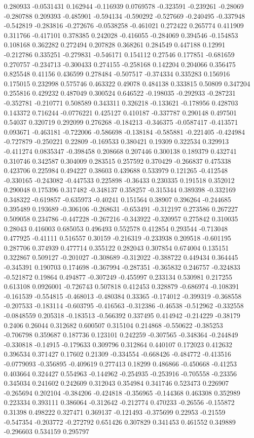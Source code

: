 0.280933 -0.0531431 0.162944 -0.116939 0.0769578 -0.323591 -0.239261 -0.28069 -0.280788 0.209393 -0.485901 -0.594134 -0.590292 -0.527669 -0.240495 -0.337948 -0.542819 -0.283816 -0.272676 -0.0538258 -0.461021 0.272422 0.265774 0.411909 0.311766 -0.417101 0.378385 0.242028 -0.416055 -0.284069 0.394546 -0.154853 0.108168 0.362282 0.272494 0.207828 0.368261 0.284549 0.447188 0.12991 -0.212786 0.335251 -0.279831 -0.546171 0.154112 0.27546 0.177851 -0.681659 0.270757 -0.234713 -0.300433 0.274155 -0.258168 0.142204 0.204066 0.356475 0.825548 0.41156 0.436599 0.278484 -0.507517 -0.374334 0.335283 0.156916 0.175015 0.232998 0.575746 0.463322 0.49078 0.484138 0.333815 0.50809 0.347204 0.255816 0.429232 0.487049 0.300524 0.646522 -0.198035 -0.292933 -0.287231 -0.352781 -0.210771 0.508589 0.343311 0.326218 -0.133621 -0.178956 0.428703 0.143372 0.716244 -0.0776221 0.425127 0.410187 -0.337787 0.290148 0.497501 0.54037 0.320719 0.292099 0.276268 -0.184213 -0.346375 -0.0587417 -0.413571 0.093671 -0.463181 -0.722006 -0.586698 -0.138184 -0.585881 -0.221405 -0.424984 -0.727879 -0.250221 0.22809 -0.169533 0.380421 0.19309 0.322534 0.329913 -0.411274 0.0835347 -0.398458 0.208668 0.207446 0.300138 0.189379 0.432741 0.310746 0.342587 0.304009 0.283515 0.257592 0.370429 -0.266837 0.475338 0.423706 0.225984 0.494227 0.38603 0.439688 0.533979 0.121265 -0.412548 -0.330165 -0.243082 -0.447533 0.225898 -0.36433 0.230335 0.191518 0.352012 0.290048 0.175396 0.317482 -0.348137 0.358257 -0.315344 0.389398 -0.332169 0.348322 -0.619857 -0.635973 -0.40241 0.151564 0.38907 0.396264 -0.244685 0.395489 0.193689 -0.306106 -0.268631 -0.653491 -0.312197 0.273586 0.267227 0.509058 0.234786 -0.447228 -0.267216 -0.343922 -0.320957 0.275842 0.310035 0.28043 0.416003 0.685053 0.496493 0.552578 0.412854 0.293544 -0.713048 0.477925 -0.41111 0.516557 0.30159 -0.216319 -0.233938 0.209518 -0.601195 0.287706 0.374939 0.477714 0.355122 0.282043 0.307854 0.674004 0.135151 0.322867 0.509127 -0.201027 -0.308689 -0.312022 -0.388722 0.449434 0.364445 -0.345391 0.190703 0.174698 -0.367994 -0.287351 -0.365832 0.246757 -0.324833 -0.521872 0.19864 0.494877 -0.307249 -0.455997 0.233134 0.530981 0.217255 0.613108 0.0926001 -0.726743 0.507818 0.412453 0.328879 -0.686974 -0.108391 -0.161539 -0.554815 -0.468013 -0.480384 0.33365 -0.174012 -0.399319 -0.368558 -0.207533 -0.183114 -0.603795 -0.416563 -0.312386 -0.46538 -0.512962 -0.332558 -0.0848559 0.205318 -0.183513 -0.566392 0.337495 0.414942 -0.214229 -0.38179 0.2406 0.26044 0.312682 0.600507 0.315104 0.214868 -0.550622 -0.385253 -0.706798 0.359687 0.187736 0.123101 0.242259 -0.307565 -0.348364 -0.244849 -0.330818 -0.14915 -0.179633 0.309796 0.312864 0.440107 0.172023 0.412632 0.396534 0.371427 0.17602 0.21309 -0.334554 -0.668426 -0.484772 -0.413516 -0.0779093 -0.356895 -0.409619 0.277413 0.18299 0.486866 -0.450668 -0.41253 0.403664 0.324427 0.554963 -0.144962 -0.254935 -0.253916 -0.705558 -0.23356 0.345034 0.241602 0.242609 0.312043 0.354984 0.341746 0.523473 0.226907 -0.265694 0.202104 -0.384206 -0.424818 -0.356965 -0.144368 0.463308 0.352989 0.223334 0.393111 0.386064 -0.312642 -0.212774 0.470233 -0.26556 -0.155872 0.31398 0.498222 0.327471 0.369137 -0.121493 -0.375699 0.22953 -0.21559 -0.547354 -0.203772 -0.272792 0.651426 0.307829 0.341453 0.461552 0.349889 -0.296603 0.534159 0.295797 
